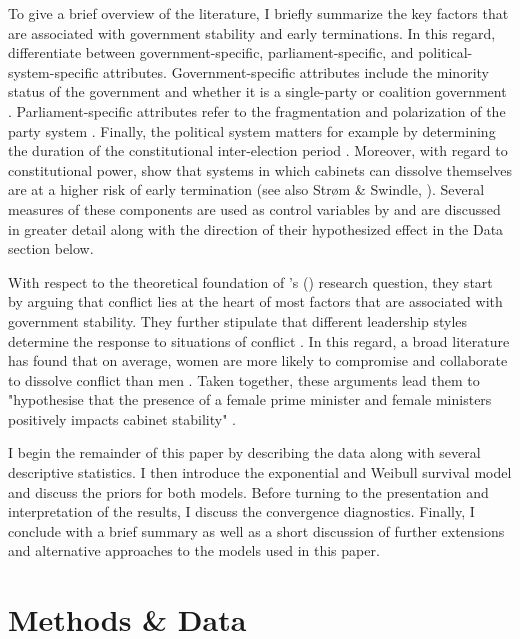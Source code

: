 \documentclass[11pt]{article}
\newcommand\possecite[1]{\citeauthor{#1}'s (\citeyear{#1})}
\begin{document}
To give a brief overview of the literature, I briefly summarize the key factors that are associated with government stability and early terminations. In this regard, \textcite{SchleiterMorganJones2009} differentiate between government-specific, parliament-specific, and political-system-specific attributes. Government-specific attributes include the minority status of the government and whether it is a single-party or coalition government \parencite{StromSwindle2002}. Parliament-specific attributes refer to the fragmentation and polarization of the party system \parencite{KingEtAl1990}. Finally, the political system matters for example by determining the duration of the constitutional inter-election period \parencite{StromSwindle2002}. Moreover, with regard to constitutional power, \textcite{SchleiterMorganJones2009} show that systems in which cabinets can dissolve themselves are at a higher risk of early termination (see also Strøm \& Swindle, \citeyear{StromSwindle2002}). Several measures of these components are used as control variables by \textcite{KK20} and are discussed in greater detail along with the direction of their hypothesized effect in the Data section below. 

With respect to the theoretical foundation of \possecite{KK20} research question, they start by arguing that conflict lies at the heart of most factors that are associated with government stability. They further stipulate that different leadership styles determine the response to situations of conflict \parencite{KK20}. In this regard, a broad literature has found that on average, women are more likely to compromise and collaborate to dissolve conflict than men \parencite[e.g.][]{KellermanRhode2017women}. Taken together, these arguments lead them to "hypothesise that the presence of a female prime minister and female ministers positively impacts cabinet stability" \parencite[4]{KK20}.

I begin the remainder of this paper by describing the data along with several descriptive statistics. I then introduce the exponential and Weibull survival model and discuss the priors for both models. Before turning to the presentation and interpretation of the results, I discuss the convergence diagnostics. Finally, I conclude with a brief summary as well as a short discussion of further extensions and alternative approaches to the models used in this paper.

\section{Methods \& Data}
\end{document}
